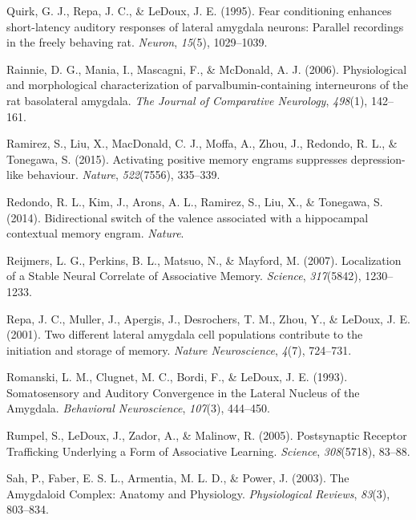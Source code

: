 \documentclass[12pt,a4paperpaper,]{report}
\begin{document}
\hypertarget{ref-quirkux5ffearux5f1995}{}
Quirk, G. J., Repa, J. C., \& LeDoux, J. E. (1995). Fear conditioning
enhances short-latency auditory responses of lateral amygdala neurons:
Parallel recordings in the freely behaving rat. \emph{Neuron},
\emph{15}(5), 1029--1039.

\hypertarget{ref-rainnieux5fphysiologicalux5f2006}{}
Rainnie, D. G., Mania, I., Mascagni, F., \& McDonald, A. J. (2006).
Physiological and morphological characterization of
parvalbumin-containing interneurons of the rat basolateral amygdala.
\emph{The Journal of Comparative Neurology}, \emph{498}(1), 142--161.

\hypertarget{ref-ramirezux5factivatingux5f2015}{}
Ramirez, S., Liu, X., MacDonald, C. J., Moffa, A., Zhou, J., Redondo, R.
L., \& Tonegawa, S. (2015). Activating positive memory engrams
suppresses depression-like behaviour. \emph{Nature}, \emph{522}(7556),
335--339.

\hypertarget{ref-redondoux5fbidirectionalux5f2014}{}
Redondo, R. L., Kim, J., Arons, A. L., Ramirez, S., Liu, X., \&
Tonegawa, S. (2014). Bidirectional switch of the valence associated with
a hippocampal contextual memory engram. \emph{Nature}.

\hypertarget{ref-reijmersux5flocalizationux5f2007}{}
Reijmers, L. G., Perkins, B. L., Matsuo, N., \& Mayford, M. (2007).
Localization of a Stable Neural Correlate of Associative Memory.
\emph{Science}, \emph{317}(5842), 1230--1233.

\hypertarget{ref-repaux5ftwoux5f2001}{}
Repa, J. C., Muller, J., Apergis, J., Desrochers, T. M., Zhou, Y., \&
LeDoux, J. E. (2001). Two different lateral amygdala cell populations
contribute to the initiation and storage of memory. \emph{Nature
Neuroscience}, \emph{4}(7), 724--731.

\hypertarget{ref-romanskiux5fsomatosensoryux5f1993}{}
Romanski, L. M., Clugnet, M. C., Bordi, F., \& LeDoux, J. E. (1993).
Somatosensory and Auditory Convergence in the Lateral Nucleus of the
Amygdala. \emph{Behavioral Neuroscience}, \emph{107}(3), 444--450.

\hypertarget{ref-rumpelux5fpostsynapticux5f2005}{}
Rumpel, S., LeDoux, J., Zador, A., \& Malinow, R. (2005). Postsynaptic
Receptor Trafficking Underlying a Form of Associative Learning.
\emph{Science}, \emph{308}(5718), 83--88.

\hypertarget{ref-sahux5famygdaloidux5f2003}{}
Sah, P., Faber, E. S. L., Armentia, M. L. D., \& Power, J. (2003). The
Amygdaloid Complex: Anatomy and Physiology. \emph{Physiological
Reviews}, \emph{83}(3), 803--834.
\end{document}
